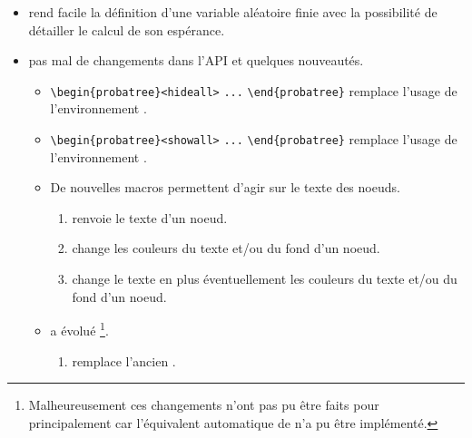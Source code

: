 \documentclass[12pt,a4paper]{book}
\begin{document}
\begin{description}
    \begin{itemize}[itemsep=.5em]
        \item {}
        	   rend facile la définition d'une variable aléatoire finie avec la possibilité de détailler le calcul de son espérance.
    
    
    
    
        \item {}
        	  pas mal de changements dans l'API et quelques nouveautés.
    
        \begin{itemize}[itemsep=.5em]
            \item \verb#\begin{probatree}<hideall># \verb#...# \verb#\end{probatree}#  remplace l'usage de l'environnement .
    
    
            \item \verb#\begin{probatree}<showall># \verb#...# \verb#\end{probatree}# remplace l'usage de l'environnement .
    
    
            \item De nouvelles macros permettent d'agir sur le texte des noeuds.
    
            \begin{enumerate}
            	\item {} renvoie le texte d'un noeud.
    
            	\item {} change les couleurs du texte et/ou du fond d'un noeud.
    
            	\item {} change le texte en plus éventuellement  les couleurs du texte et/ou du fond d'un noeud.
            \end{enumerate}
    
    
            \item {} a évolué
                  \footnote{
                  		Malheureusement ces changements n'ont pas pu être faits pour  principalement car l'équivalent automatique de  n'a pu être implémenté.
    			  }.
    
            \begin{enumerate}
            	\item {} remplace l'ancien .
    

\end{enumerate}
\end{itemize}
\end{itemize}
\end{description}
\end{document}
